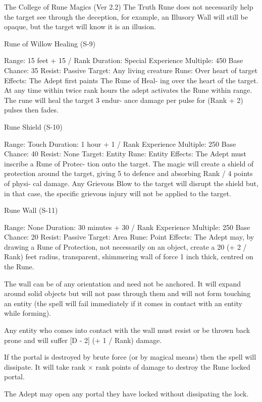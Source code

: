 \begin{Chapter}{The College of Rune Magics (Ver 2.2)}
The Truth Rune does not necessarily help the target 
see through the deception, for example, an Illusory 
Wall  will still be opaque, but  the target  will know 
it is an illusion. 

Rune of Willow Healing (S-9) 

Range: 15 feet + 15 / Rank 
Duration: Special 
Experience Multiple: 450 
Base Chance: 35%
Resist: Passive 
Target: Any living creature 
Rune: Over heart of target 
Effects:  The  Adept  first  paints  The  Rune  of  Heal-
ing over the heart of the target. At any time within 
twice  rank  hours  the  adept  activates  the  Rune 
within range. The rune will heal the target 3 endur-
ance  damage  per  pulse  for  (Rank  + 2)  pulses  then 
fades. 

Rune Shield (S-10) 

Range: Touch 
Duration: 1 hour + 1 / Rank 
Experience Multiple: 250 
Base Chance: 40%
Resist: None 
Target: Entity  
Rune: Entity 
Effects: The Adept must inscribe a Rune of Protec-
tion onto the target. The magic will create a shield 
of protection around the target, giving  5%
to defence and absorbing Rank / 4 points of physi-
cal  damage.  Any  Grievous  Blow  to  the  target  will 
disrupt  the  shield  but,  in  that  case,  the  specific 
grievous injury will not be applied to the target. 

Rune Wall (S-11) 

Range: None 
Duration: 30 minutes + 30 / Rank 
Experience Multiple: 250 
Base Chance: 20%
Resist: Passive 
Target: Area 
Rune: Point 
Effects:  The  Adept  may,  by  drawing  a  Rune  of 
Protection, not necessarily on an object, create a 20 
(+  2  /  Rank)  feet  radius,  transparent,  shimmering 
wall of force 1 inch thick, centred on the Rune. 

The wall can be of any orientation and need not be 
anchored.  It  will  expand  around  solid  objects  but 
will  not  pass  through  them  and  will  not  form 
touching an entity (the spell will fail immediately if 
it comes in contact with an entity while forming). 

Any  entity  who  comes  into  contact  with  the  wall 
must resist or be thrown back prone and will suffer 
[D - 2] (+ 1 / Rank) damage. 

If  the  portal  is  destroyed  by  brute  force  (or  by 
magical means) then the spell will dissipate. It will 
take  rank  ×  rank  points  of  damage  to  destroy  the 
Rune locked portal. 

The  Adept  may  open  any  portal  they  have  locked 
without dissipating the lock. 


\end{Chapter}
